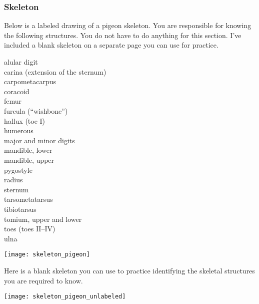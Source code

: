 \documentclass[10pt]{article}
\begin{document}
\newpage

\subsubsection*{Skeleton}

Below is a labeled drawing of a pigeon skeleton. You are responsible for knowing the following structures. You do not have to do anything for this section. I've included a blank skeleton on a separate page you can use for practice.



\begin{multicols}{3}
alular digit\\
carina (extension of the sternum)\\
carpometacarpus\\
coracoid\\
femur\\
furcula (“wishbone”)\\
hallux (toe I)\\
humerous\\
major and minor digits\\
mandible, lower\\
mandible, upper\\
pygostyle\\
radius\\
sternum\\
tarsometatarsus\\
tibiotarsus\\
tomium, upper and lower\\
toes (toes II–IV)\\
ulna
\end{multicols}


\begin{center}
\texttt{[image: skeleton\_pigeon]}

\end{center}

\newpage

Here is a blank skeleton you can use to practice identifying the skeletal structures you are required to know.

\vfill

\begin{center}
\texttt{[image: skeleton\_pigeon\_unlabeled]}

\end{center}

\vfill
\end{document}
